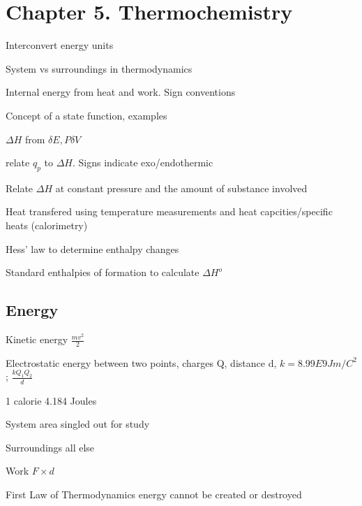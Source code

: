 \section{Chapter 5. Thermochemistry}

\secttoc

{\footnotesize
\begin{multicols}{3}
\begin{compactenum}
    \item Interconvert energy units
    \item System vs surroundings in thermodynamics
    \item Internal energy from heat and work. Sign conventions
    \item Concept of a state function, examples
    \item $\Delta H$ from $\delta E, P \delta V$
    \item relate $q_p$ to $\Delta H$. Signs indicate exo/endothermic
    \item Relate $\Delta H$ at constant pressure and the amount
        of substance involved
    \item Heat transfered using temperature measurements and heat capcities/specific heats (calorimetry)
    \item Hess' law to determine enthalpy changes
    \item Standard enthalpies of formation to calculate $\Delta H^{o}$
\end{compactenum}
\end{multicols}
}


\begin{mdframed}\begin{multicols}{2}\subsection{Energy}
\begin{compactdesc}
    \item[Kinetic energy] $\frac{mv^2}{2}$
    \item[Electrostatic energy] between two points, charges Q, distance d,
        $k=8.99E9 Jm/C^2$; $\frac{kQ_1Q_2}{d}$
    \item[1 calorie] 4.184 Joules
    \item[System] area singled out for study
    \item[Surroundings] all else
    \item[Work] $F \times d$
    \item[First Law of Thermodynamics] energy cannot be created or destroyed
\end{compactdesc}\end{multicols}\end{mdframed}


